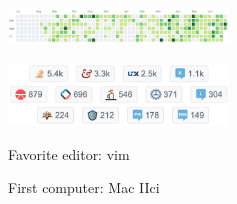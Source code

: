 \documentclass[letterpaper]{deedy-resume} %
\begin{document}
\begin{minipage}[t]{0.33\textwidth}
\sectionspace %


\includegraphics[width=2.3in]{github-work}

\sectionspace %

\includegraphics[width=2.3in]{stackoverflow-reps}

Favorite editor: vim

First computer: Mac IIci

\section{}
\section{}
\section{}

\section{}
\section{}

\section{}
\sectionspace %

\section{}
\sectionspace %
\section{}


\end{minipage}
\end{document}

